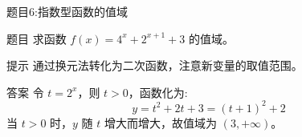   
  \begin{frame}{题目6:指数型函数的值域}
    \begin{block}{题目}
        求函数 $f(x) = 4^x + 2^{x+1} + 3$ 的值域。
    \end{block}
    
    \begin{alertblock}{提示}
        通过换元法转化为二次函数，注意新变量的取值范围。
    \end{alertblock}
    
    \pause
    
    \begin{block}{答案}
        令 $t = 2^x$，则 $t > 0$，函数化为:
        \[
        y = t^2 + 2t + 3 = (t + 1)^2 + 2
        \]
        当 $t > 0$ 时，$y$ 随 $t$ 增大而增大，故值域为 $(3, +\infty)$。
    \end{block}
  \end{frame}
  
  
  
  
  
  
  
  
  
  
  
  